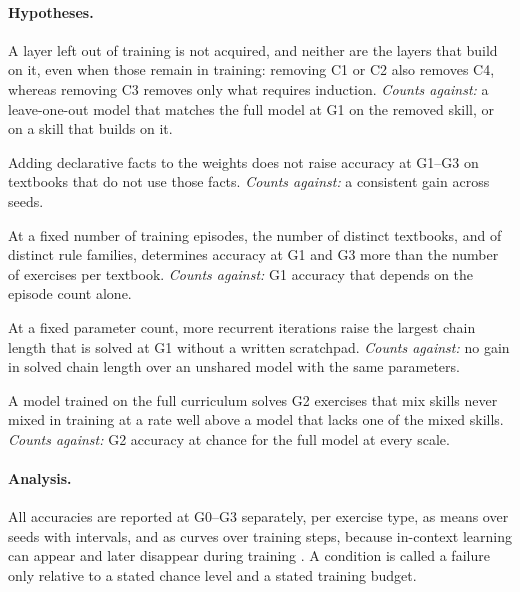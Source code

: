 \documentclass[11pt]{article}
\begin{document}
\paragraph{Hypotheses.}
\begin{description}[leftmargin=1.5em,itemsep=2pt]
\item[H1 (necessity is ordered).] A layer left out of training is not acquired, and neither are the layers that build on it, even when those remain in training: removing C1 or C2 also removes C4, whereas removing C3 removes only what requires induction. \emph{Counts against:} a leave-one-out model that matches the full model at G1 on the removed skill, or on a skill that builds on it.
\item[H2 (facts do not help reading).] Adding declarative facts to the weights does not raise accuracy at G1--G3 on textbooks that do not use those facts. \emph{Counts against:} a consistent gain across seeds.
\item[H3 (variety beats volume).] At a fixed number of training episodes, the number of distinct textbooks, and of distinct rule families, determines accuracy at G1 and G3 more than the number of exercises per textbook. \emph{Counts against:} G1 accuracy that depends on the episode count alone.
\item[H4 (loops buy depth).] At a fixed parameter count, more recurrent iterations raise the largest chain length that is solved at G1 without a written scratchpad. \emph{Counts against:} no gain in solved chain length over an unshared model with the same parameters.
\item[H5 (skills transfer upward).] A model trained on the full curriculum solves G2 exercises that mix skills never mixed in training at a rate well above a model that lacks one of the mixed skills. \emph{Counts against:} G2 accuracy at chance for the full model at every scale.
\end{description}

\paragraph{Analysis.}
All accuracies are reported at G0--G3 separately, per exercise type, as means over seeds with intervals, and as curves over training steps, because in-context learning can appear and later disappear during training \citep{singh2023transient}.
A condition is called a failure only relative to a stated chance level and a stated training budget.
\end{document}
